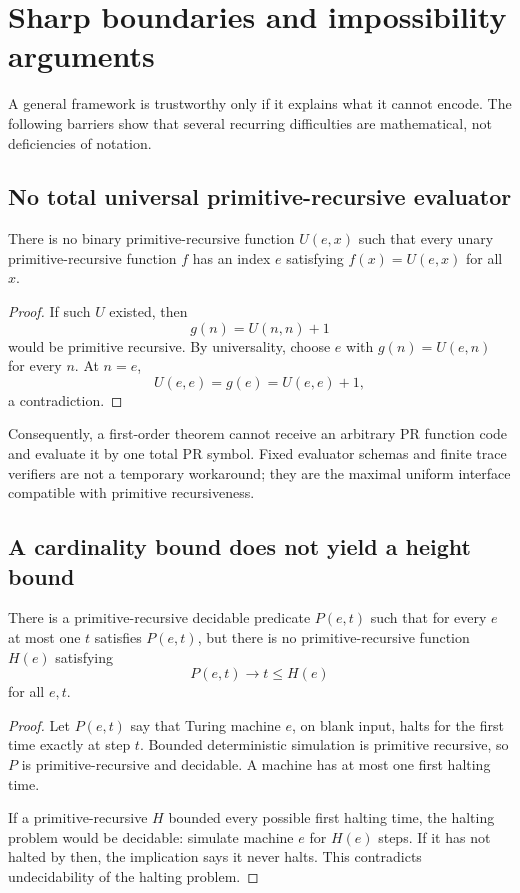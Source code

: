 \section{Sharp boundaries and impossibility arguments}
\label{sec:barriers}

A general framework is trustworthy only if it explains what it cannot encode.
The following barriers show that several recurring difficulties are
mathematical, not deficiencies of notation.

\subsection{No total universal primitive-recursive evaluator}

\begin{theorem}
\label{thm:no-universal-pr}
There is no binary primitive-recursive function \(U(e,x)\) such that every
unary primitive-recursive function \(f\) has an index \(e\) satisfying
\(f(x)=U(e,x)\) for all \(x\).
\end{theorem}

\begin{proof}
If such \(U\) existed, then
\[
 g(n)=U(n,n)+1
\]
would be primitive recursive.  By universality, choose \(e\) with
\(g(n)=U(e,n)\) for every \(n\).  At \(n=e\),
\[
 U(e,e)=g(e)=U(e,e)+1,
\]
a contradiction.
\end{proof}

Consequently, a first-order theorem cannot receive an arbitrary PR function
code and evaluate it by one total PR symbol.  Fixed evaluator schemas and
finite trace verifiers are not a temporary workaround; they are the maximal
uniform interface compatible with primitive recursiveness.

\subsection{A cardinality bound does not yield a height bound}

\begin{theorem}
\label{thm:cardinality-not-height}
There is a primitive-recursive decidable predicate \(P(e,t)\) such that for
every \(e\) at most one \(t\) satisfies \(P(e,t)\), but there is no
primitive-recursive function \(H(e)\) satisfying
\[
 P(e,t)\to t\le H(e)
\]
for all \(e,t\).
\end{theorem}

\begin{proof}
Let \(P(e,t)\) say that Turing machine \(e\), on blank input, halts for the
first time exactly at step \(t\).  Bounded deterministic simulation is
primitive recursive, so \(P\) is primitive-recursive and decidable.  A machine
has at most one first halting time.

If a primitive-recursive \(H\) bounded every possible first halting time, the
halting problem would be decidable: simulate machine \(e\) for \(H(e)\) steps.
If it has not halted by then, the implication says it never halts.  This
contradicts undecidability of the halting problem.
\end{proof}

